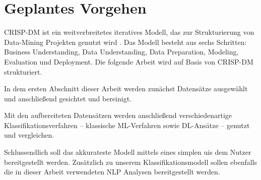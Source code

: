 \section{Geplantes Vorgehen}

\ac{CRISP-DM} ist ein weitverbreitetes iteratives Modell, das zur Strukturierung von Data-Mining Projekten genutzt wird \autocite{martinez-plumed_casp-dm_2017, chapman_crisp-dm_2000}. Das Modell besteht aus sechs Schritten: Business Understanding, Data Understanding, Data Preparation, Modeling, Evaluation und Deployment. Die folgende Arbeit wird auf Basis von \ac{CRISP-DM} strukturiert.

In dem ersten Abschnitt dieser Arbeit werden zunächst Datensätze ausgewählt und anschließend gesichtet und bereinigt.

Mit den aufbereiteten Datensätzen werden anschließend verschiedenartige Klassifikationsverfahren -- klassische \ac{ML}-Verfahren sowie \ac{DL}-Ansätze -- genutzt und vergleichen.

Schlussendlich soll das akkurateste Modell mittels eines simplen \acp{ui} dem Nutzer bereitgestellt werden. Zusätzlich zu unserem Klassifikationsmodell sollen ebenfalls die in dieser Arbeit verwendeten \ac{NLP} Analysen bereitgestellt werden.

